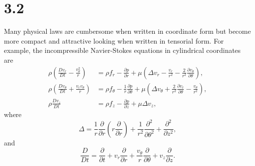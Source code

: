 \section{3.2}
\label{sec:3.2}


\begin{rem}
  Many physical laws are cumbersome
  when written in coordinate form
  but become more compact and attractive looking
  when written in tensorial form.
  For example,
  the incompressible Navier-Stokes equations in cylindrical coordinates are
  \begin{align*}
    \rho\left(\frac{Dv_r}{Dt}-\frac{v_{\theta}^2}{r}\right) &= \rho f_r-\frac{\partial p}{\partial r} + \mu\left(\Delta v_r-\frac{v_r}{r^2}-\frac{2}{r^2}\frac{\partial v_{\theta}}{\partial \theta}\right), \\
    \rho\left(\frac{Dv_{\theta}}{Dt}+\frac{v_rv_{\theta}}{r}\right) &= \rho f_{\theta}-\frac{1}{r}\frac{\partial p}{\partial\theta} + \mu\left(\Delta v_{\theta}+\frac{2}{r^2}\frac{\partial v_r}{\partial\theta}-\frac{v_{\theta}}{r^2}\right), \\
    \rho \frac{Dv_z}{Dt} &= \rho f_z-\frac{\partial p}{\partial z}+\mu\Delta v_z,
  \end{align*}
  where
  \begin{equation*}
    \Delta = \frac{1}{r}\frac{\partial}{\partial r}\left(r \frac{\partial}{\partial r}\right)+\frac{1}{r^2}\frac{\partial^2}{\partial \theta^2}+\frac{\partial^2}{\partial z^2},
  \end{equation*}
  and
  \begin{equation*}
    \frac{D}{Dt} = \frac{\partial}{\partial t}+v_r \frac{\partial}{\partial r}+\frac{v_{\theta}}{r}\frac{\partial}{\partial\theta}+v_z \frac{\partial}{\partial z}.
  \end{equation*}
\end{rem}

